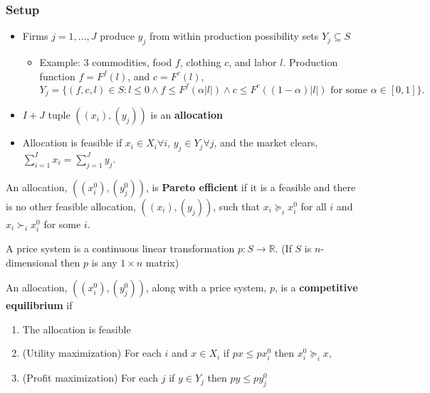 \documentclass[compress]{beamer}
\def\R{\mathbb{R}}
\newcommand{\prefeq}{\succeq}
\newcommand{\pref}{\succ}
\begin{document}
\begin{frame}
  \frametitle{Setup}
  \begin{itemize}
  \item Firms $j=1,...,J$ produce $y_j$ from within production
    possibility sets $Y_j \subseteq S$
    \begin{itemize}
    \item Example: 3 commodities, food $f$, clothing $c$, and labor
      $l$. Production function $f = F^f(l)$, and $c = F^c(l)$,
      \[ Y_j = \{ (f,c,l) \in S: l \leq 0 \wedge f \leq F^f(\alpha |l|)
      \wedge c \leq F^c((1-\alpha) |l|) \text{ for some } \alpha \in
      [0,1]\}. \] 
    \end{itemize}
  \item $I+J$ tuple $((x_i),(y_j))$ is an \textbf{allocation} 
  \item Allocation is feasible if $x_i \in X_i \forall i$, $y_j \in
    Y_j \forall j$, and the market clears, 
    $\sum_{i=1}^I x_i = \sum_{j=1}^J y_j$.
  \end{itemize}
\end{frame}  

\begin{frame}
  \begin{definition}
    An allocation, $((x_i^0),(y_j^0))$, is \textbf{Pareto efficient}
    if it is a feasible and there is no other feasible allocation,
    $((x_i),(y_j))$, such that $x_i \prefeq_i x_i^0$ for all $i$ and
    $x_i \pref_i x_i^0$ for some $i$.
  \end{definition}

  \begin{definition}
    A price system is a continuous linear transformation $p:S
    \rightarrow \R$. (If $S$ is $n$-dimensional then $p$ is any $1
    \times n$ matrix)
  \end{definition}
\end{frame}

\begin{frame}
  \begin{definition}
    An allocation, $((x_i^0),(y_j^0))$, along with a price system, $p$,
    is a \textbf{competitive equilibrium} if 
    \renewcommand{\theenumi}{C\arabic{enumi}}
    \begin{enumerate}
    \item\label{c1} The allocation is feasible
    \item\label{c2} (Utility maximization) For each $i$ and $x \in X_i$
      if $px \leq px_i^0$ 
      then $x_i^0 \prefeq_i x$, 
    \item\label{c3} (Profit maximization) For each $j$ if $y \in Y_j$
      then $p y \leq p y_j^0$ 
    \end{enumerate}
    \renewcommand{\theenumi}{\roman{enumi}}
  \end{definition}
\end{frame}
\end{document}

